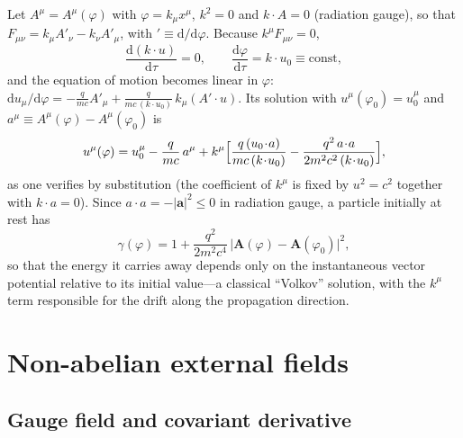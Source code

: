 \documentclass[11pt,a4paper]{book}
\numberwithin{equation}{section}
\newcommand{\dd}{\mathrm{d}}
\theoremstyle{definition}
\theoremstyle{remark}
\begin{document}
Let $A^\mu=A^\mu(\varphi)$ with $\varphi=k_\mu x^\mu$, $k^2=0$ and
$k\!\cdot\!A=0$ (radiation gauge), so that
$F_{\mu\nu}=k_\mu A'_\nu-k_\nu A'_\mu$, with $'\equiv\dd/\dd\varphi$.  Because
$k^\mu F_{\mu\nu}=0$,
\begin{equation}
  \frac{\dd(k\!\cdot\!u)}{\dd\tau}=0,\qquad
  \frac{\dd\varphi}{\dd\tau}=k\!\cdot\!u_0\equiv\text{const},
\end{equation}
and the equation of motion becomes linear in $\varphi$:
$\dd u_\mu/\dd\varphi=-\tfrac q{mc}A'_\mu+\tfrac q{mc\,(k\cdot u_0)}\,k_\mu(A'\!\cdot\!u)$.
Its solution with $u^\mu(\varphi_0)=u_0^\mu$ and $a^\mu\equiv A^\mu(\varphi)-A^\mu(\varphi_0)$ is
\begin{equation}
  u^\mu(\varphi)=u_0^\mu-\frac q{mc}\,a^\mu
  +k^\mu\Bigl[\frac{q\,(u_0\!\cdot\!a)}{mc\,(k\!\cdot\!u_0)}-\frac{q^2\,a\!\cdot\!a}{2m^2c^2\,(k\!\cdot\!u_0)}\Bigr],
  \label{eq:Volkov-classical}
\end{equation}
as one verifies by substitution (the coefficient of $k^\mu$ is fixed by
$u^2=c^2$ together with $k\!\cdot\!a=0$).  Since $a\!\cdot\!a=-|\mathbf a|^2\le0$ in
radiation gauge, a particle initially at rest has
\begin{equation}
  \gamma(\varphi)=1+\frac{q^2}{2m^2c^4}\,\bigl|\mathbf A(\varphi)-\mathbf A(\varphi_0)\bigr|^2 ,
\end{equation}
so that the energy it carries away depends only on the instantaneous
vector potential relative to its initial value---a classical
``Volkov'' solution, with the $k^\mu$ term responsible for the drift along
the propagation direction.

\section{Non-abelian external fields}\label{sec:nonabelian}

\subsection{Gauge field and covariant derivative}
\end{document}
